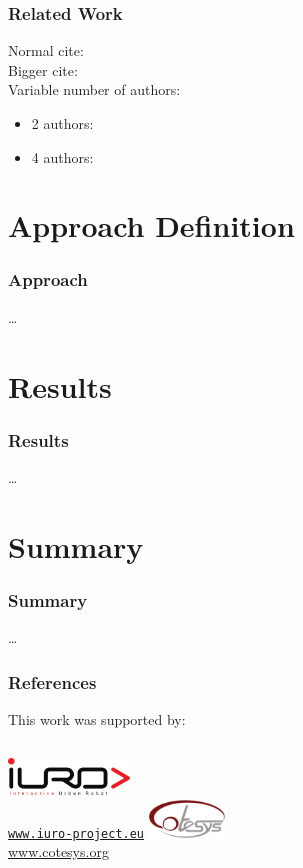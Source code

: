 \documentclass[noshadow]{LSRslides}
\begin{document}
\begin{frame}
	\frametitle{Related Work}
	Normal cite: \cite{buss11}\\
	Bigger cite: \\
	Variable number of authors: 
	\begin{itemize}
		\item 2 authors: 
		\item 4 authors: 
	\end{itemize}
\end{frame}

\section[Approach]{Approach Definition}
\begin{frame}
	\frametitle{Approach}
	\dots
\end{frame}

\section{Results}

\begin{frame}
	\frametitle{Results}
	\dots
\end{frame}

\section{Summary}

\begin{frame}
	\frametitle{Summary}
	\dots
\end{frame}

\appendix
\begin{frame}
	\frametitle{References}
	\printbibliography
	This work was supported by:
	\vspace{0.2cm}
	\begin{columns}[onlytextwidth,T]
		\centering
		\includegraphics[height=1cm]{iuro}\\
		\href{http://www.iuro-project.eu}{\texttt{www.iuro-project.eu}}
		\centering
		\includegraphics[height=1cm]{cotesys}\\
		\url{www.cotesys.org}
	\end{columns}
\end{frame}
\end{document}
